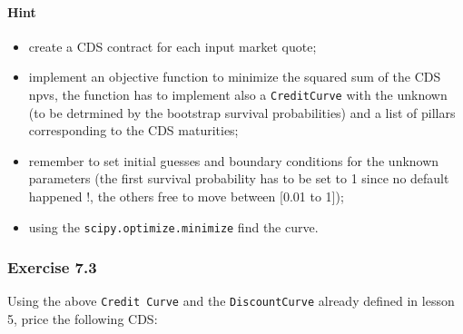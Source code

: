 \documentclass[11pt]{article}
\providecommand{\tightlist}{%
      \setlength{\itemsep}{0pt}\setlength{\parskip}{0pt}}
\begin{document}
\hypertarget{hint}{%
\paragraph{Hint}\label{hint}}

\begin{itemize}
\tightlist
\item
  create a CDS contract for each input market quote;
\item
  implement an objective function to minimize the squared sum of the CDS
  npvs, the function has to implement also a \texttt{CreditCurve} with
  the unknown (to be detrmined by the bootstrap survival probabilities)
  and a list of pillars corresponding to the CDS maturities;
\item
  remember to set initial guesses and boundary conditions for the
  unknown parameters (the first survival probability has to be set to 1
  since no default happened !, the others free to move between {[}0.01
  to 1{]});
\item
  using the \texttt{scipy.optimize.minimize} find the curve.
\end{itemize}

    \hypertarget{exercise-7.3}{%
\subsubsection{Exercise 7.3}\label{exercise-7.3}}

Using the above \texttt{Credit\ Curve} and the \texttt{DiscountCurve}
already defined in lesson 5, price the following CDS:
\end{document}
